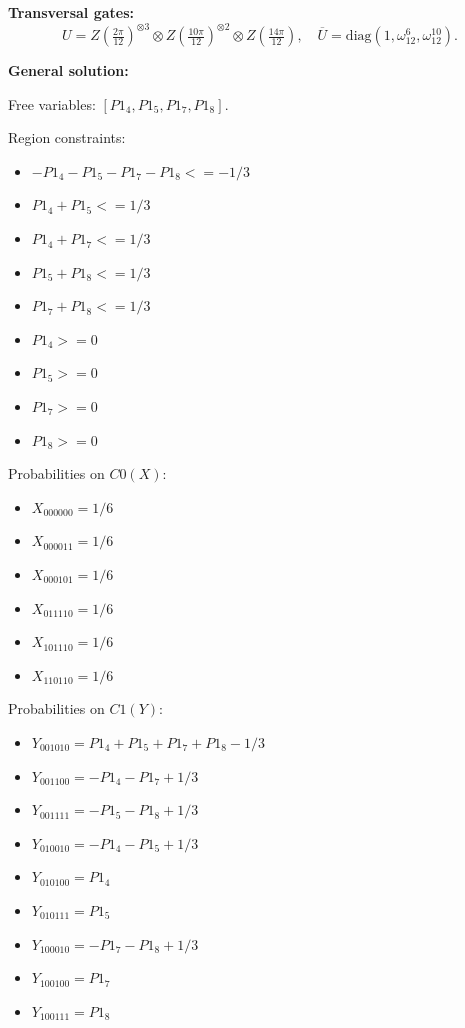 \documentclass[11pt]{article}
\begin{document}
\noindent\textbf{Transversal gates:}
\[
    U=Z \left(\tfrac{2\pi}{12}\right)^{\otimes3} \otimes Z \left(\tfrac{10\pi}{12}\right)^{\otimes2} \otimes Z \left(\tfrac{14\pi}{12}\right),\quad
    \overline U=\mathrm{diag}(1,\omega_{12}^{6},\omega_{12}^{10}).
\]

\noindent\textbf{General solution:}

Free variables: $[P1_4, P1_5, P1_7, P1_8]$.

Region constraints:
\begin{itemize}
    \item $-P1_4 - P1_5 - P1_7 - P1_8 <= -1/3$
    \item $P1_4 + P1_5 <= 1/3$
    \item $P1_4 + P1_7 <= 1/3$
    \item $P1_5 + P1_8 <= 1/3$
    \item $P1_7 + P1_8 <= 1/3$
    \item $P1_4 >= 0$
    \item $P1_5 >= 0$
    \item $P1_7 >= 0$
    \item $P1_8 >= 0$
\end{itemize}

Probabilities on $C0 (X)$:
\begin{itemize}
    \item $X_{000000} = 1/6$
    \item $X_{000011} = 1/6$
    \item $X_{000101} = 1/6$
    \item $X_{011110} = 1/6$
    \item $X_{101110} = 1/6$
    \item $X_{110110} = 1/6$
\end{itemize}

Probabilities on $C1 (Y)$:
\begin{itemize}
    \item $Y_{001010} = P1_4 + P1_5 + P1_7 + P1_8 - 1/3$
    \item $Y_{001100} = -P1_4 - P1_7 + 1/3$
    \item $Y_{001111} = -P1_5 - P1_8 + 1/3$
    \item $Y_{010010} = -P1_4 - P1_5 + 1/3$
    \item $Y_{010100} = P1_4$
    \item $Y_{010111} = P1_5$
    \item $Y_{100010} = -P1_7 - P1_8 + 1/3$
    \item $Y_{100100} = P1_7$
    \item $Y_{100111} = P1_8$
\end{itemize}
\end{document}
